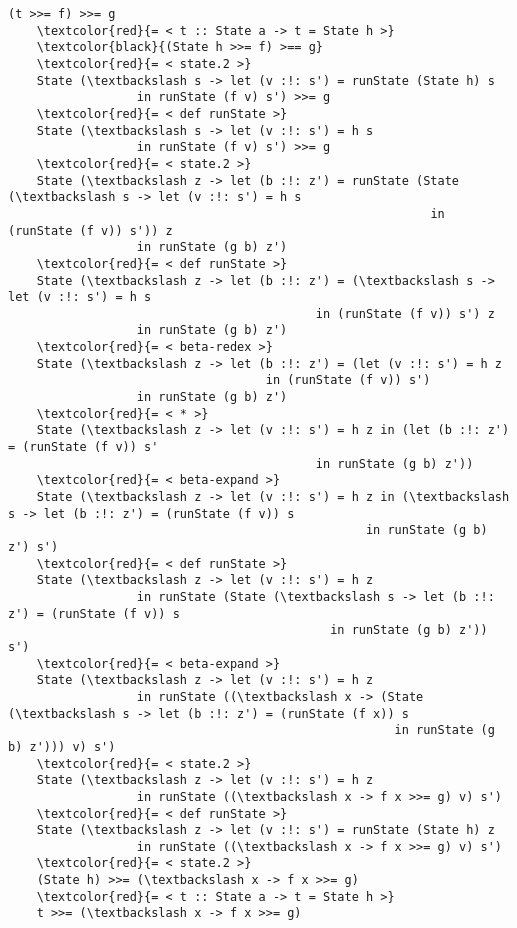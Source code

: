 \documentclass[11pt]{article}
\begin{document}
\begin{Verbatim}[commandchars=\\\{\}] 
    (t >>= f) >>= g
    \textcolor{red}{= < t :: State a -> t = State h >}
    \textcolor{black}{(State h >>= f) >== g}
    \textcolor{red}{= < state.2 >}
    State (\textbackslash s -> let (v :!: s') = runState (State h) s
                  in runState (f v) s') >>= g
    \textcolor{red}{= < def runState >}
    State (\textbackslash s -> let (v :!: s') = h s 
                  in runState (f v) s') >>= g
    \textcolor{red}{= < state.2 >}
    State (\textbackslash z -> let (b :!: z') = runState (State (\textbackslash s -> let (v :!: s') = h s
                                                           in (runState (f v)) s')) z
                  in runState (g b) z')
    \textcolor{red}{= < def runState >}
    State (\textbackslash z -> let (b :!: z') = (\textbackslash s -> let (v :!: s') = h s 
                                           in (runState (f v)) s') z
                  in runState (g b) z')
    \textcolor{red}{= < beta-redex >}
    State (\textbackslash z -> let (b :!: z') = (let (v :!: s') = h z 
                                    in (runState (f v)) s')
                  in runState (g b) z')
    \textcolor{red}{= < * >}
    State (\textbackslash z -> let (v :!: s') = h z in (let (b :!: z') = (runState (f v)) s' 
                                           in runState (g b) z'))
    \textcolor{red}{= < beta-expand >}
    State (\textbackslash z -> let (v :!: s') = h z in (\textbackslash s -> let (b :!: z') = (runState (f v)) s
                                                  in runState (g b) z') s')
    \textcolor{red}{= < def runState >}
    State (\textbackslash z -> let (v :!: s') = h z 
                  in runState (State (\textbackslash s -> let (b :!: z') = (runState (f v)) s
                                             in runState (g b) z')) s')
    \textcolor{red}{= < beta-expand >}
    State (\textbackslash z -> let (v :!: s') = h z 
                  in runState ((\textbackslash x -> (State (\textbackslash s -> let (b :!: z') = (runState (f x)) s
                                                      in runState (g b) z'))) v) s')
    \textcolor{red}{= < state.2 >}
    State (\textbackslash z -> let (v :!: s') = h z 
                  in runState ((\textbackslash x -> f x >>= g) v) s')
    \textcolor{red}{= < def runState >}
    State (\textbackslash z -> let (v :!: s') = runState (State h) z 
                  in runState ((\textbackslash x -> f x >>= g) v) s')
    \textcolor{red}{= < state.2 >}
    (State h) >>= (\textbackslash x -> f x >>= g)
    \textcolor{red}{= < t :: State a -> t = State h >}
    t >>= (\textbackslash x -> f x >>= g)
\end{Verbatim}
\end{document}
